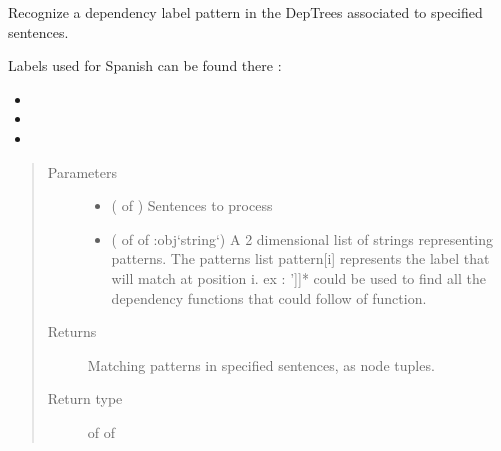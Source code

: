 \documentclass[letterpaper,10pt,english]{sphinxmanual}
\begin{document}
\begin{fulllineitems}
\label{\detokenize{index:loacore.analysis.pattern_recognition.label_patterns_recognition}}
Recognize a dependency label pattern in the DepTrees associated to specified sentences.

Labels used for Spanish can be found there :
\begin{itemize}
\item {} 

\item {} 

\item {} 

\end{itemize}
\begin{quote}\begin{description}
\item[{Parameters}] \leavevmode\begin{itemize}
\item {} 
 ( of ) \textendash{} Sentences to process

\item {} 
 ( of  of :obj{}`string{}`) \textendash{} A 2 dimensional list of strings representing patterns. The patterns list pattern{[}i{]} represents the label that
will match at position i. ex : \sphinxstyleemphasis{pattern = {[}{[}‘sentence’, ‘v’{]}, {[}‘}’{]}{]}* could be used to find all the dependency
functions that could follow  of  function.

\end{itemize}

\item[{Returns}] \leavevmode
Matching patterns in specified sentences, as node tuples.

\item[{Return type}] \leavevmode
{} of  of 


\end{description}
\end{quote}
\end{fulllineitems}
\end{document}
